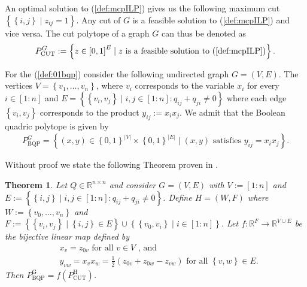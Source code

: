 \documentclass[12pt,a4paper]{article}
\theoremstyle{mythm}
\newtheorem{thm}{Theorem}[section]
\begin{document}
An optimal solution to (\ref{def:mcpILP}) gives us the following maximum cut $ \left\{ \left\{ i,j \right\}  \mid z _{ ij } = 1 \right\}  $.
Any cut of $ G $ is a feasible solution to (\ref{def:mcpILP}) and vice versa.
The cut polytope of a graph $ G $ can thus be denoted as 
\begin{align*}
P ^{ G } _{ \text{CUT}  } := \left\{ z \in \left[ 0,1 \right] ^{ E }   \mid  z \text{ is a feasible solution to } (\ref{def:mcpILP}) \right\}.
\end{align*} 

For the \BQP (\ref{def:01bqp}) consider the following undirected graph $ G = (V,E) $. The vertices $ V = \left\{ v_1, \dots , v_n \right\} $, where $ v_i $ corresponds to the
variable $ x_i $ for every $ i \in \left[ 1:n \right]  $ and $ E = \left\{ \left\{ v_i, v_j \right\}  \mid i,j \in \left[ 1:n \right] : q _{ ij } + q _{ ji } \neq 0  \right\}
$ where each edge $ \left\{ v_i , v_j \right\}  $ corresponds to the product $ y _{ ij } := x_i x_j $.
We admit that the Boolean quadric polytope is given by 
\begin{align*}
P ^{ G } _{ \text{BQP} } = \left\{ (x,y) \in \left\{ 0,1 \right\} ^{ \left| V \right|  } \times \left\{ 0, 1 \right\} ^{ \left| E \right|  }  \mid (x,y) \text{ satisfies } y
_{ ij } = x_i x_j \right\}.
\end{align*} 

Without proof we state the following Theorem proven in \cite{DeSimone1990}.
\begin{thm}
\label{thm:simone} 
Let $ Q \in \mathbb{R} ^{ n \times n }  $ and consider $ G = ( V,E ) $ with $ V := \left[ 1 : n \right] $ and $ E := \left\{ \left\{ i,j \right\}  \mid i,j \in \left[ 1:n
\right] : q _{ ij } + q _{ ji } \neq 0   \right\}  $. Define $ H = \left( W,F \right)  $ where $ W:= \left\{ v_0, \dots , v_n \right\}  $ and $ F := \left\{ \left\{ v_i,v_j
\right\}  \mid \left\{ i,j \right\} \in E \right\} \cup \left\{ \left\{ v_0,v_i \right\} \mid i \in \left[ 1:n \right]  \right\} $. 
Let $ f : \mathbb{R} ^{ F  }  \to \mathbb{R} ^{ V \cup E }  $ be the bijective linear map defined by
\begin{align*}
&x_v = z _{ 0v } \text{ for all } v \in V \text{ , and } \\
&y _{ vw } = x_v x_w = \frac{ 1 }{ 2 } \left( z _{ 0v } + z _{ 0w } - z _{ vw }  \right) \text{ for all  } \left\{ v,w \right\} \in E.
\end{align*}  
Then $ P ^{ \text{G}  }  _{ \text{BQP}  } = f \left( P ^{ \text{H}  } _{ \text{CUT}  }  \right)   $.
\end{thm} 
\end{document}
